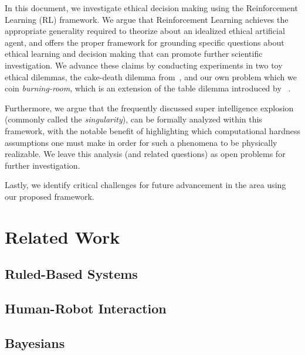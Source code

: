 \documentclass[11pt]{article}
\begin{document}
In this document, we investigate ethical decision making using the Reinforcement Learning (RL) framework. We argue that Reinforcement Learning achieves the appropriate generality required to theorize about an idealized ethical artificial agent, and offers the proper framework for grounding specific questions about ethical learning and decision making that can promote further scientific investigation. We advance these claims by conducting experiments in two toy ethical dilemmas, the cake-death dilemma from~\cite{AAAIW1510183}, and our own problem which we coin {\it burning-room}, which is an extension of the table dilemma introduced by ~\cite{briggs2015sorry}.

Furthermore, we argue that the frequently discussed super intelligence explosion (commonly called the {\it singularity}), can be formally analyzed within this framework, with the notable benefit of highlighting which computational hardness assumptions one must make in order for such a phenomena to be physically realizable. We leave this analysis (and related questions) as open problems for further investigation.

Lastly, we identify critical challenges for future advancement in the area using our proposed framework.


\section{Related Work}



\subsection{Ruled-Based Systems}


\subsection{Human-Robot Interaction}


\subsection{Bayesians}
\end{document}
